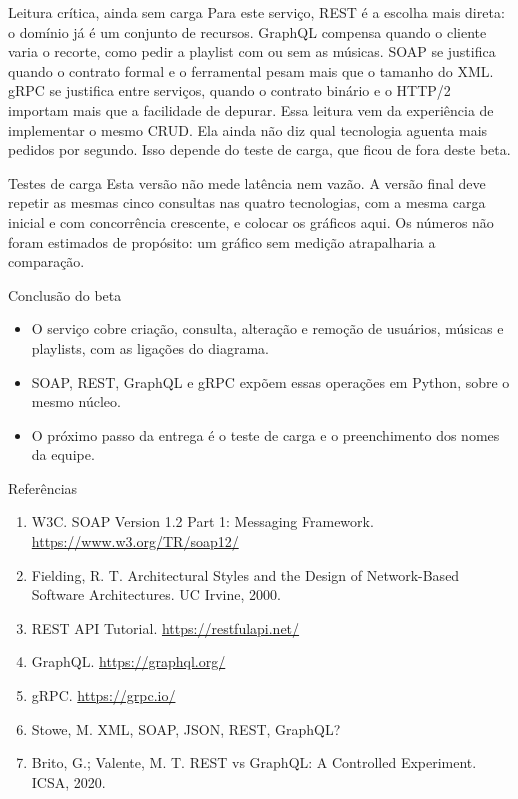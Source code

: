 \documentclass[aspectratio=169,11pt]{beamer}
\begin{document}
\begin{frame}{Leitura crítica, ainda sem carga}
  Para este serviço, REST é a escolha mais direta: o domínio já é um conjunto de recursos. GraphQL compensa quando o cliente varia o recorte, como pedir a playlist com ou sem as músicas. SOAP se justifica quando o contrato formal e o ferramental pesam mais que o tamanho do XML. gRPC se justifica entre serviços, quando o contrato binário e o HTTP/2 importam mais que a facilidade de depurar.
  \vspace{0.6em}
  Essa leitura vem da experiência de implementar o mesmo CRUD. Ela ainda não diz qual tecnologia aguenta mais pedidos por segundo. Isso depende do teste de carga, que ficou de fora deste beta.
\end{frame}

\begin{frame}{Testes de carga}
  Esta versão não mede latência nem vazão.
  \vspace{0.5em}
  A versão final deve repetir as mesmas cinco consultas nas quatro tecnologias, com a mesma carga inicial e com concorrência crescente, e colocar os gráficos aqui. Os números não foram estimados de propósito: um gráfico sem medição atrapalharia a comparação.
\end{frame}

\begin{frame}{Conclusão do beta}
  \begin{itemize}
    \item O serviço cobre criação, consulta, alteração e remoção de usuários, músicas e playlists, com as ligações do diagrama.
    \item SOAP, REST, GraphQL e gRPC expõem essas operações em Python, sobre o mesmo núcleo.
    \item O próximo passo da entrega é o teste de carga e o preenchimento dos nomes da equipe.
  \end{itemize}
\end{frame}

\begin{frame}{Referências}
  \scriptsize
  \begin{enumerate}
    \item W3C. SOAP Version 1.2 Part 1: Messaging Framework. \url{https://www.w3.org/TR/soap12/}
    \item Fielding, R. T. Architectural Styles and the Design of Network-Based Software Architectures. UC Irvine, 2000.
    \item REST API Tutorial. \url{https://restfulapi.net/}
    \item GraphQL. \url{https://graphql.org/}
    \item gRPC. \url{https://grpc.io/}
    \item Stowe, M. XML, SOAP, JSON, REST, GraphQL?
    \item Brito, G.; Valente, M. T. REST vs GraphQL: A Controlled Experiment. ICSA, 2020.
  \end{enumerate}
\end{frame}
\end{document}
